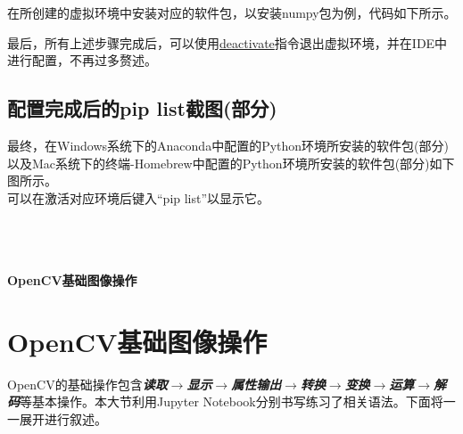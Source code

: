 \documentclass[11pt]{article}
\begin{document}
\begin{enumerate}
    	在所创建的虚拟环境中安装对应的软件包，以安装numpy包为例，代码如下所示。
    	\begin{center}
    	\end{center}
    	
    	最后，所有上述步骤完成后，可以使用\underline{deactivate}指令退出虚拟环境，并在IDE中进行配置，不再过多赘述。
    	\subsection{配置完成后的pip list截图(部分)}
    	最终，在Windows系统下的Anaconda中配置的Python环境所安装的软件包(部分)以及Mac系统下的终端-Homebrew中配置的Python环境所安装的软件包(部分)如下图所示。\\
    	可以在激活对应环境后键入“pip list”以显示它。
    \begin{center}
	\end{center}
	
    \end{enumerate}
    
    \newpage
    \\
    \\ \\
    {\Huge \textbf{OpenCV基础图像操作}}
    \newpage
    
    \section{OpenCV基础图像操作}
    OpenCV的基础操作包含\textbf{\textit{读取$\to$显示$\to$属性输出$\to$转换$\to$变换$\to$运算$\to$解码}}等基本操作。本大节利用Jupyter Notebook分别书写练习了相关语法。下面将一一展开进行叙述。
    
\end{document}
